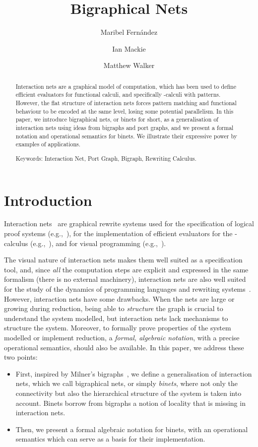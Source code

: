 \documentclass[copyright,creativecommons]{eptcs}
\title{Bigraphical Nets}
\author{Maribel Fern\'andez
\and Ian Mackie 
\and Matthew Walker
\institute{\'Ecole Normale Sup\'erieure,  Paris, France\\
\'Ecole Polytechnique,  Palaiseau, France\\
King's College London, Dept.\ of Informatics,  London WC2R 2LS, UK}
}
\begin{document}
\maketitle


\begin{abstract} 
Interaction nets are a graphical model of computation, which has been
used to define efficient evaluators for functional calculi, and
specifically -calculi with patterns.  However, the flat
structure of interaction nets forces pattern matching and functional
behaviour to be encoded at the same level, losing some potential
parallelism.  In this paper, we introduce bigraphical nets, or
binets for short, as a generalisation
of interaction nets using ideas from bigraphs and port graphs, and we
present a formal notation and operational semantics for binets.  We
illustrate their expressive power by examples of applications.

Keywords: Interaction Net, Port Graph, Bigraph, Rewriting Calculus.
\end{abstract}

\section{Introduction}

Interaction nets~\cite{LafontY:intn} are graphical rewrite systems
used for the specification of logical proof systems
(e.g.,~\cite{AlvesS:gracp,LafontY:fropni}), for the implementation of
efficient evaluators for the -calculus
(e.g.,~\cite{GonthierG:geoolr,AspertiA:bolhom,MackieIC:efflei}), and
for visual programming
(e.g.,~\cite{MackieIC:diagrams,MackieIC:tamc,MackieIC:vcc}).

The visual nature of interaction nets makes them well suited as a
specification tool, and, since \emph{all} the computation steps are
explicit and expressed in the same formalism (there is no external
machinery), interaction nets are also well suited for the study of the
dynamics of programming languages and rewriting
systems~\cite{MackieIC:intntr,FernandezM:inMCpa,PintoJS:seqcam}. 
However, interaction nets have some drawbacks. 
When the nets are large or growing during reduction, being able to
\emph{structure} the graph is crucial to understand the system
modelled, but interaction nets lack mechanisms to structure the system.
Moreover, to formally prove properties of the system modelled or
implement reduction, a \emph{formal, algebraic notation}, with a
precise operational semantics, should also be available. In this
paper, we address these two points:
\begin{itemize}
\item
 First, inspired by Milner's bigraphs~\cite{Milner}, we define a
 generalisation of interaction nets, which we call bigraphical nets,
 or simply \emph{binets}, where not only the connectivity but also
 the hierarchical structure of the system is taken into
 account. Binets borrow from bigraphs a notion of locality that is
 missing in interaction nets.
\item
Then,  we present a
formal algebraic notation for binets, with an operational semantics
which can serve as a basis for their implementation.
\end{itemize}
\end{document}

